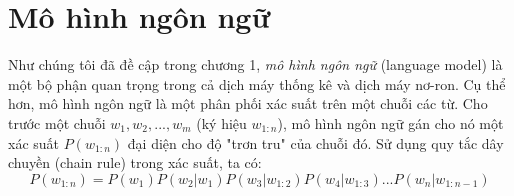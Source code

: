 \section{Mô hình ngôn ngữ}

Như chúng tôi đã đề cập trong chương 1, \textit{mô hình ngôn ngữ} (language model) là một bộ phận quan trọng trong cả dịch máy thống kê và dịch máy nơ-ron. Cụ thể hơn, mô hình ngôn ngữ là một phân phối xác suất trên một chuỗi các từ. Cho trước một chuỗi $w_1,w_2,...,w_m$ (ký hiệu $w_{1:n}$), mô hình ngôn ngữ gán cho nó một xác suất $P(w_{1:n})$ đại diện cho độ "trơn tru" của chuỗi đó. Sử dụng quy tắc dây chuyền (chain rule) trong xác suất, ta có:
\begin{equation} \label{lmGeneral}
	P(w_{1:n}) = P(w_1)P(w_2|w_1)P(w_3|w_{1:2})P(w_4|w_{1:3})...P(w_n|w_{1:n-1})
\end{equation}














